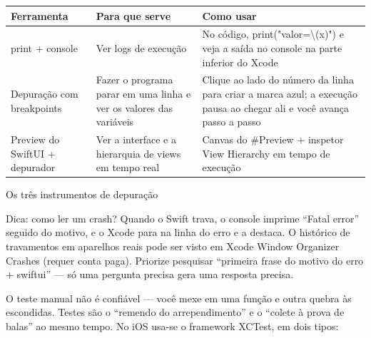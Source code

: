 


\begin{center}
\begin{tabularx}{\linewidth}{|X|X|X|}
\hline
\textbf{Ferramenta} & \textbf{Para que serve} & \textbf{Como usar} \tabularnewline
\hline
print + console & Ver logs de execução & No código, print("valor=\textbackslash{}(x)") e veja a saída no console na parte inferior do Xcode \tabularnewline
Depuração com breakpoints & Fazer o programa parar em uma linha e ver os valores das variáveis & Clique ao lado do número da linha para criar a marca azul; a execução pausa ao chegar ali e você avança passo a passo \tabularnewline
Preview do SwiftUI + depurador & Ver a interface e a hierarquia de views em tempo real & Canvas do \#Preview + inspetor View Hierarchy em tempo de execução \tabularnewline
\hline
\end{tabularx}
\end{center}

\begin{center}\small\color{gray}Os três instrumentos de depuração\end{center}

\begin{tcbinfo}{Dica: como ler um crash?}
Quando o Swift trava, o console imprime “Fatal error” seguido do motivo, e o Xcode para na linha do erro e a destaca. O histórico de travamentos em aparelhos reais pode ser visto em Xcode Window Organizer Crashes (requer conta paga). Priorize pesquisar “primeira frase do motivo do erro + swiftui” — só uma pergunta precisa gera uma resposta precisa.

\end{tcbinfo}


O teste manual não é confiável — você mexe em uma função e outra quebra às escondidas. Testes são o “remendo do arrependimento” e o “colete à prova de balas” ao mesmo tempo. No iOS usa-se o framework XCTest, em dois tipos:

